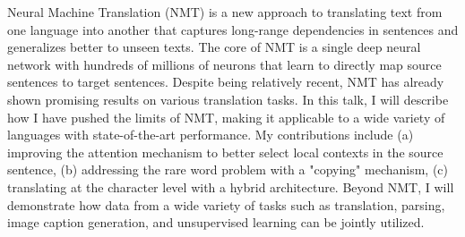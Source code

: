 Neural Machine Translation (NMT) is a new approach to translating text from one
language into another that captures long-range dependencies in sentences and
generalizes better to unseen texts. The core of NMT is a single deep neural
network with hundreds of millions of neurons that learn to directly map source
sentences to target sentences. Despite being relatively recent, NMT has already
shown promising results on various translation tasks. In this talk, I will
describe how I have pushed the limits of NMT, making it applicable to a wide
variety of languages with state-of-the-art performance. My contributions include
(a) improving the attention mechanism to better select local contexts in the
source sentence, (b) addressing the rare word problem with a "copying"
mechanism, (c) translating at the character level with a hybrid architecture.
Beyond NMT, I will demonstrate how data from a wide variety of tasks such as
translation, parsing, image caption generation, and unsupervised learning can be
jointly utilized.


